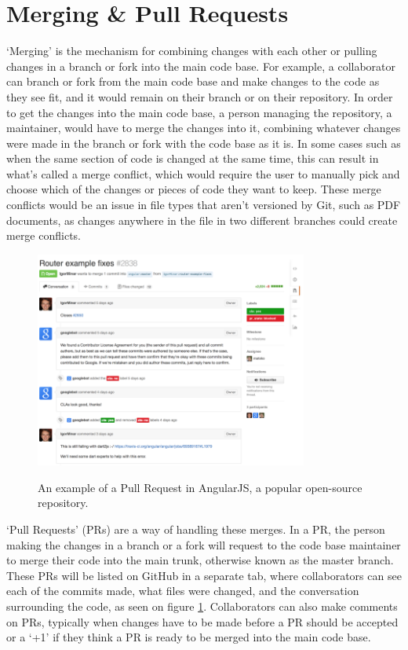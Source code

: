 \section{Merging \& Pull Requests}
`Merging' is the mechanism for combining changes with each other or pulling changes in a branch or fork into the main code base. For example, a collaborator can branch or fork from the main code base and make changes to the code as they see fit, and it would remain on their branch or on their repository. In order to get the changes into the main code base, a person managing the repository, a maintainer, would have to merge the changes into it, combining whatever changes were made in the branch or fork with the code base as it is. In some cases such as when the same section of code is changed at the same time, this can result in what's called a merge conflict, which would require the user to manually pick and choose which of the changes or pieces of code they want to keep. These merge conflicts would be an issue in file types that aren't versioned by Git, such as PDF documents, as changes anywhere in the file in two different branches could create merge conflicts.

\begin{figure}[h!]
 \caption{An example of a Pull Request in AngularJS, a popular open-source repository.}
 \centering
   \includegraphics[width=0.8\textwidth]{pullRequests}
 \label{fig:pull_requests}
\end{figure}

`Pull Requests' (PRs) are a way of handling these merges. In a PR, the person making the changes in a branch or a fork will request to the code base maintainer to merge their code into the main trunk, otherwise known as the master branch. These PRs will be listed on GitHub in a separate tab, where collaborators can see each of the commits made, what files were changed, and the conversation surrounding the code, as seen on figure \ref{fig:pull_requests}. Collaborators can also make comments on PRs, typically when changes have to be made before a PR should be accepted or a `+1' if they think a PR is ready to be merged into the main code base.

